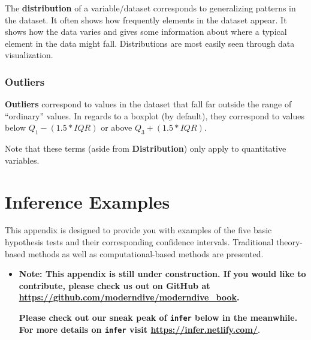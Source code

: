 \documentclass[12pt,]{krantz}
\makeatletter
\newenvironment{Shaded}{\begin{snugshade}}{\end{snugshade}}
\newcommand{\KeywordTok}[1]{\textcolor[rgb]{0.27,0.27,0.27}{\textbf{#1}}}
\newcommand{\DataTypeTok}[1]{\textcolor[rgb]{0.27,0.27,0.27}{#1}}
\newcommand{\StringTok}[1]{\textcolor[rgb]{0.5,0.5,0.5}{#1}}
\newcommand{\NormalTok}[1]{#1}
\newenvironment{kframe}{%
\medskip{}
\setlength{\fboxsep}{.8em}
 \def\at@end@of@kframe{}%
 \ifinner\ifhmode%
  \def\at@end@of@kframe{\end{minipage}}%
  \begin{minipage}{\columnwidth}%
 \fi\fi%
 \def\FrameCommand##1{\hskip\@totalleftmargin \hskip-\fboxsep
 \colorbox{shadecolor}{##1}\hskip-\fboxsep
     \hskip-\linewidth \hskip-\@totalleftmargin \hskip\columnwidth}%
 \MakeFramed {\advance\hsize-\width
   \@totalleftmargin\z@ \linewidth\hsize
   \@setminipage}}%
 {\par\unskip\endMakeFramed%
 \at@end@of@kframe}
\renewenvironment{Shaded}{\begin{kframe}}{\end{kframe}}
\newenvironment{rmdblock}[1]
  {\begin{shaded*}
  \begin{itemize}
  \renewcommand{\labelitemi}{
    \raisebox{-.7\height}[0pt][0pt]{
    }
  }
  \item
  }
  {
  \end{itemize}
  \end{shaded*}
  }
\newenvironment{learncheck}
  {\begin{rmdblock}{warning}}
  {\end{rmdblock}}
\theoremstyle{definition}
\theoremstyle{definition}
\theoremstyle{definition}
\theoremstyle{remark}
\makeatother
\begin{document}
The \textbf{distribution} of a variable/dataset corresponds to
generalizing patterns in the dataset. It often shows how frequently
elements in the dataset appear. It shows how the data varies and gives
some information about where a typical element in the data might fall.
Distributions are most easily seen through data visualization.

\subsection{Outliers}\label{outliers}

\textbf{Outliers} correspond to values in the dataset that fall far
outside the range of ``ordinary'' values. In regards to a boxplot (by
default), they correspond to values below \(Q_1 - (1.5 * IQR)\) or above
\(Q_3 + (1.5 * IQR)\).

Note that these terms (aside from \textbf{Distribution}) only apply to
quantitative variables.

\chapter{Inference Examples}\label{appendixB}

This appendix is designed to provide you with examples of the five basic
hypothesis tests and their corresponding confidence intervals.
Traditional theory-based methods as well as computational-based methods
are presented.

\begin{learncheck}
\textbf{Note: This appendix is still under construction. If you would
like to contribute, please check us out on GitHub at
\url{https://github.com/moderndive/moderndive_book}.}

\textbf{Please check out our sneak peak of \texttt{infer} below in the
meanwhile. For more details on \texttt{infer} visit
\url{https://infer.netlify.com/}}.
\end{learncheck}

\begin{Shaded}
\end{Shaded}
\end{document}
